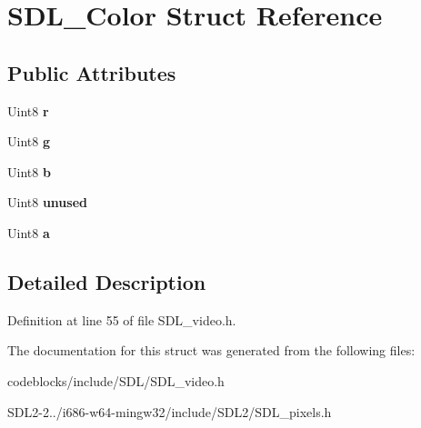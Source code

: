 \hypertarget{structSDL__Color}{\section{S\+D\+L\+\_\+\+Color Struct Reference}
\label{structSDL__Color}
}
\subsection*{Public Attributes}
\begin{DoxyCompactItemize}
\item 
\hypertarget{structSDL__Color_a0bb975b6829524133fdd3c6060cfa63d}{Uint8 {\bfseries r}}\label{structSDL__Color_a0bb975b6829524133fdd3c6060cfa63d}

\item 
\hypertarget{structSDL__Color_ae29d881bf740cfa7078b36e07f85d298}{Uint8 {\bfseries g}}\label{structSDL__Color_ae29d881bf740cfa7078b36e07f85d298}

\item 
\hypertarget{structSDL__Color_a3b79a27e0414049559aa5bcf241dedd3}{Uint8 {\bfseries b}}\label{structSDL__Color_a3b79a27e0414049559aa5bcf241dedd3}

\item 
\hypertarget{structSDL__Color_a72c141f474a236dd0e881a4167783e2e}{Uint8 {\bfseries unused}}\label{structSDL__Color_a72c141f474a236dd0e881a4167783e2e}

\item 
\hypertarget{structSDL__Color_ac497ba67af6ecb4d51bdd0945b314526}{Uint8 {\bfseries a}}\label{structSDL__Color_ac497ba67af6ecb4d51bdd0945b314526}

\end{DoxyCompactItemize}


\subsection{Detailed Description}


Definition at line 55 of file S\+D\+L\+\_\+video.\+h.



The documentation for this struct was generated from the following files\+:\begin{DoxyCompactItemize}
\item 
codeblocks/include/\+S\+D\+L/S\+D\+L\+\_\+video.\+h\item 
S\+D\+L2-\/2../i686-\/w64-\/mingw32/include/\+S\+D\+L2/S\+D\+L\+\_\+pixels.\+h\end{DoxyCompactItemize}
